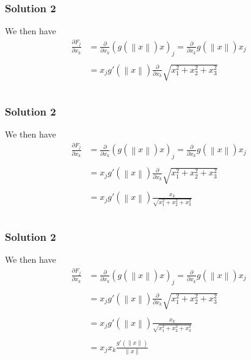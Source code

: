 \documentclass[10pt, t, allowdisplaybreaks]{beamer}
\begin{document}
\begin{frame}
    \frametitle{Solution 2}
    We then have 
    \begin{equation*}
        \begin{split}
            \frac{\partial F_j}{\partial x_k} &= \frac{\partial}{\partial x_k}\left(g(\left\lVert x\right\rVert )x\right)_j
            = \frac{\partial}{\partial x_k}g(\left\lVert x\right\rVert )x_j\\\\
            &= x_j g'(\left\lVert x\right\rVert )\frac{\partial }{\partial x_k}\sqrt{x_1^2+x_2^2+x_3^2} \\\\
        \end{split}
    \end{equation*}
\end{frame}
\begin{frame}
    \frametitle{Solution 2}
    We then have 
    \begin{equation*}
        \begin{split}
            \frac{\partial F_j}{\partial x_k} &= \frac{\partial}{\partial x_k}\left(g(\left\lVert x\right\rVert )x\right)_j
            = \frac{\partial}{\partial x_k}g(\left\lVert x\right\rVert )x_j\\\\
            &= x_j g'(\left\lVert x\right\rVert )\frac{\partial }{\partial x_k}\sqrt{x_1^2+x_2^2+x_3^2} \\\\
            &= x_j g'(\left\lVert x\right\rVert )\frac{x_k}{\sqrt{x_1^2+x_2^2+x_3^2}} \\\\
        \end{split}
    \end{equation*}
\end{frame}
\begin{frame}
    \frametitle{Solution 2}
    We then have 
    \begin{equation*}
        \begin{split}
            \frac{\partial F_j}{\partial x_k} &= \frac{\partial}{\partial x_k}\left(g(\left\lVert x\right\rVert )x\right)_j
            = \frac{\partial}{\partial x_k}g(\left\lVert x\right\rVert )x_j\\\\
            &= x_j g'(\left\lVert x\right\rVert )\frac{\partial }{\partial x_k}\sqrt{x_1^2+x_2^2+x_3^2} \\\\
            &= x_j g'(\left\lVert x\right\rVert )\frac{x_k}{\sqrt{x_1^2+x_2^2+x_3^2}} \\\\
            &= x_j x_k \frac{g'(\left\lVert x\right\rVert )}{\left\lVert x\right\rVert }\\\\
        \end{split}
    \end{equation*}
\end{frame}
\end{document}
